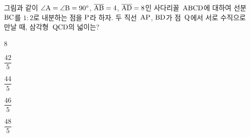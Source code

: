 \noindent\begin{minipage}[t]{0.58\linewidth}\vspace{0pt}\raggedright 그림과 같이 $\angle\mathrm{A}=\angle\mathrm{B}=90^\circ$, $\overline{\mathrm{AB}}=4$, $\overline{\mathrm{AD}}=8$인 사다리꼴~$\mathrm{ABCD}$에 대하여 선분~$\mathrm{BC}$를 $1:2$로 내분하는 점을 $\mathrm{P}$라 하자. 두 직선~$\mathrm{AP}$, $\mathrm{BD}$가 점~$\mathrm{Q}$에서 서로 수직으로 만날 때, 삼각형~$\mathrm{QCD}$의 넓이는?\end{minipage}\hfill\begin{minipage}[t]{0.4\linewidth}\vspace{0pt}\centering \resizebox{\ifdim\width>\linewidth\linewidth\else\width\fi}{!}{}\end{minipage}\par
\begin{choices32}{\rule[-3ex]{0pt}{8ex}$8$}{\rule[-3ex]{0pt}{8ex}$\dfrac{42}{5}$}{\rule[-3ex]{0pt}{8ex}$\dfrac{44}{5}$}{\rule[-3ex]{0pt}{8ex}$\dfrac{46}{5}$}{\rule[-3ex]{0pt}{8ex}$\dfrac{48}{5}$}\end{choices32}
